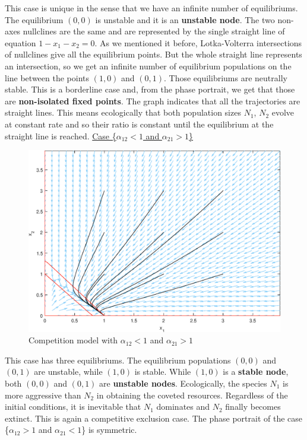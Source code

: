 \documentclass[11pt,a4paper]{scrartcl}
\theoremstyle{definition}
\begin{document}
This case is unique in the sense that we have an infinite number of equilibriums. The equilibrium $(0, 0)$ is unstable and it is an \textbf{unstable node}. The two non-axes nullclines are the same and are represented by the single straight line of equation $1-x_1-x_2=0$. As we mentioned it before, Lotka-Volterra intersections of nullclines give all the equilibrium points. But the whole straight line represents an intersection, so we get an infinite number of equilibrium populations on the line between the points $(1, 0)$ and $(0, 1)$. Those equilibriums are neutrally stable. This is a borderline case and, from the phase portrait, we get that those are \textbf{non-isolated fixed points}. The graph indicates that all the trajectories are straight lines. This means ecologically that both population sizes $N_1$, $N_2$ evolve at constant rate and so their ratio is constant until the equilibrium at the straight line is reached.
\FloatBarrier
\vspace{1em}
\underline{Case \Big\{$\alpha_{12} < 1$ and $\alpha_{21} > 1$\Big\}}\newline

\begin{figure}[!ht]
\centering
\includegraphics[scale=.6]{fig_8.eps}
\caption{Competition model with $\alpha_{12} < 1$ and $\alpha_{21} > 1$}
\label{figC8}
\end{figure} 

This case has three equilibriums. The equilibrium populations $(0, 0)$ and $(0, 1)$ are unstable, while $(1, 0)$ is stable. While $(1, 0)$ is a \textbf{stable node}, both $(0, 0)$ and $(0, 1)$ are \textbf{unstable nodes}. Ecologically, the species $N_1$ is more aggressive than $N_2$ in obtaining the coveted resources. Regardless of the initial conditions, it is inevitable that $N_1$ dominates and $N_2$ finally becomes extinct. This is again a competitive exclusion case. The phase portrait of the case \Big\{$\alpha_{12} > 1$ and $\alpha_{21} < 1$\Big\} is symmetric.
\FloatBarrier
\end{document}

